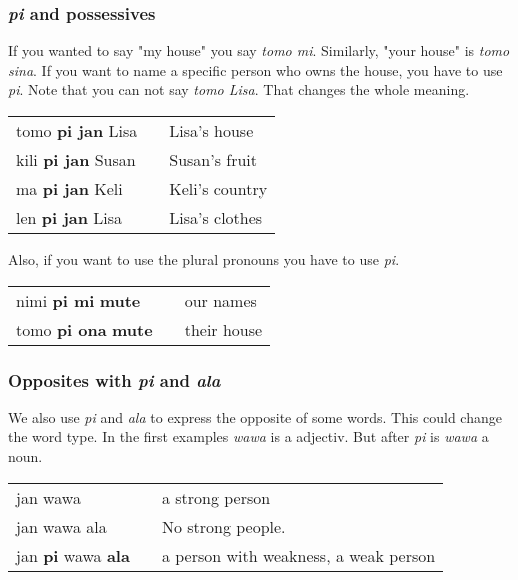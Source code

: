 \subsubsection*{\textit{pi} and possessives} 
%
If you wanted to say "my house" you say \textit{tomo mi}. 
Similarly, "your house" is \textit{tomo sina}. 
If you want to name a specific person who owns the house, you have to use \textit{pi}. 
Note that you can not say \textit{tomo Lisa}. 
That changes the whole meaning. 

\begin{supertabular}{p{5,5cm}|ll}
tomo \textbf{pi jan} Lisa && Lisa's house \\
kili \textbf{pi jan} Susan && Susan's fruit \\
ma \textbf{pi jan} Keli && Keli's country \\
len \textbf{pi jan} Lisa && Lisa's clothes \\
\end{supertabular}  

Also, if you want to use the plural pronouns you have to use \textit{pi}.

\begin{supertabular}{p{5,5cm}|ll}
nimi \textbf{pi mi} \textbf{mute} && our names \\
tomo \textbf{pi ona} \textbf{mute} && their house \\
\end{supertabular}  

\subsubsection*{Opposites with \textit{pi} and \textit{ala}}

We also use \textit{pi} and \textit{ala} to express the opposite of some words. 
This could change the word type. In the first examples \textit{wawa} is a
adjectiv. But after \textit{pi} is \textit{wawa} a noun.

\begin{supertabular}{p{5,5cm}|ll}
jan wawa && a strong person \\
jan wawa ala && No strong people. \\ 
jan \textbf{pi} wawa \textbf{ala} && a person with weakness, a weak person \\
\end{supertabular}  

